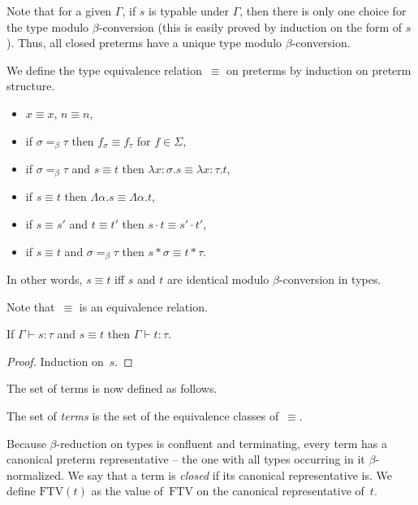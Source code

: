 \documentclass[runningheads,a4paper]{llncs}
\newcommand{\abs}[2]{\lambda #1.#2}
\newcommand{\tabs}[2]{\Lambda #1.#2}
\newcommand{\tapp}[2]{#1 * #2}
\newcommand{\FTV}{\mathrm{FTV}}
\begin{document}
Note that for a given $\Gamma$, if $s$ is typable under $\Gamma$, then
there is only one choice for the type modulo $\beta$-conversion (this
is easily proved by induction on the form of $s$). Thus, all closed
preterms have a unique type modulo $\beta$-conversion.

\begin{definition}\label{def_type_equiv}
  We define the type equivalence relation~$\equiv$ on preterms by
  induction on preterm structure.
  \begin{itemize}
  \item $x \equiv x$, $n \equiv n$,
  \item if $\sigma =_\beta \tau$ then $f_\sigma \equiv f_\tau$ for
    $f \in \Sigma$,
  \item if $\sigma =_\beta \tau$ and $s \equiv t$ then
    $\abs{x:\sigma}{s} \equiv \abs{x:\tau}{t}$,
  \item if $s \equiv t$ then $\tabs{\alpha}{s} \equiv
    \tabs{\alpha}{t}$,
  \item if $s \equiv s'$ and $t \equiv t'$ then $s \cdot t \equiv s'
    \cdot t'$,
  \item if $s \equiv t$ and $\sigma =_\beta \tau$ then
    $\tapp{s}{\sigma} \equiv \tapp{t}{\tau}$.
  \end{itemize}
  In other words, $s \equiv t$ iff $s$ and $t$ are identical modulo
  $\beta$-conversion in types.
\end{definition}

Note that~$\equiv$ is an equivalence relation.

\begin{lemma}
  If $\Gamma \vdash s : \tau$ and $s \equiv t$ then $\Gamma \vdash t :
  \tau$.
\end{lemma}

\begin{proof}
  Induction on~$s$.
\end{proof}

The set of terms is now defined as follows.

\begin{definition}\label{def_terms}\normalfont
  The set of \emph{terms} is the set of the equivalence classes
  of~$\equiv$.
\end{definition}

Because $\beta$-reduction on types is confluent and terminating, every
term has a canonical preterm representative -- the one with all types
occurring in it $\beta$-normalized. We say that a term is
\emph{closed} if its canonical representative is. We define $\FTV(t)$
as the value of~$\FTV$ on the canonical representative of~$t$.
\end{document}
